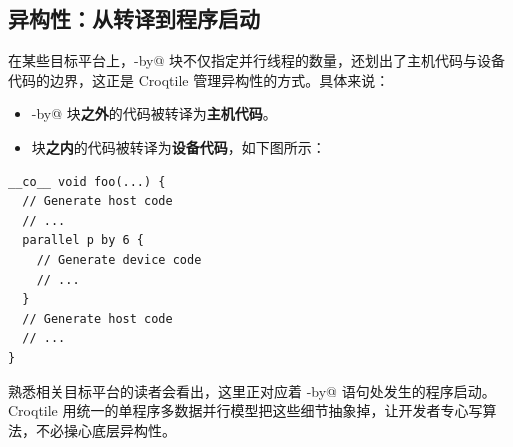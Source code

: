 \subsection*{异构性：从转译到程序启动}

在某些目标平台上，\co@parallel-by@ 块不仅指定并行线程的数量，还划出了主机代码与设备代码的边界，这正是 Croqtile 管理异构性的方式。具体来说：

\begin{itemize}[leftmargin=1.6em]
\item \co@parallel-by@ 块\textbf{之外}的代码被转译为\textbf{主机代码}。
\item 块\textbf{之内}的代码被转译为\textbf{设备代码}，如下图所示：
\end{itemize}

\begin{lstlisting}[language=croqtile,caption={异构性：从转译到程序启动}]
__co__ void foo(...) {
  // Generate host code
  // ...
  parallel p by 6 {
    // Generate device code
    // ...
  }
  // Generate host code
  // ...
}
\end{lstlisting}

熟悉相关目标平台的读者会看出，这里正对应着 \co@parallel-by@ 语句处发生的程序启动。Croqtile 用统一的单程序多数据并行模型把这些细节抽象掉，让开发者专心写算法，不必操心底层异构性。

